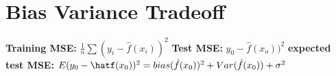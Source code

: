 \section{Bias Variance Tradeoff}
 \textbf{Training MSE: } $\frac{1}{n} \sum (y_i-\hat f(x_i))^2 $ \textbf{Test MSE: } $y_0 - \hat f(x_o))^2$ \textbf{expected test MSE: } $E(y_0- \hatf(x_0))^2 = bias(\hat f(x_0))^2 + Var(\hat f(x_0)) + \sigma^2$